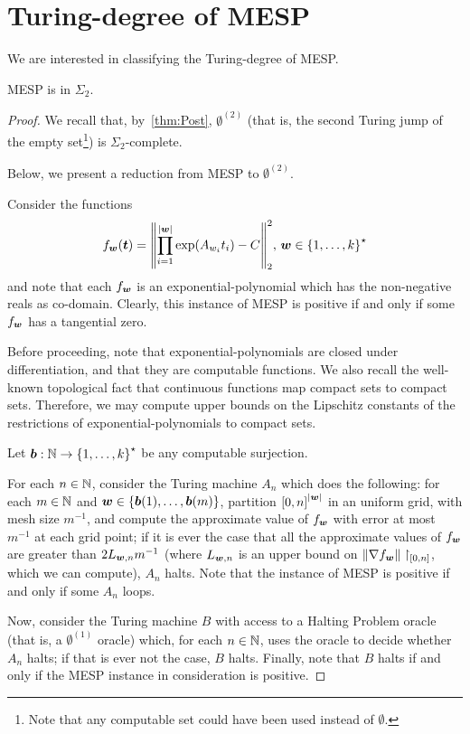 \section{Turing-degree of MESP}
\label{sec:turing-degree-lics}

We are interested in classifying the Turing-degree of MESP\@.

\begin{theorem}
\label{thm:turing-degree-2}
  MESP is in $\Sigma_{2}$.
\end{theorem}

\begin{proof}
We recall that, by~\cref{thm:Post}, $\emptyset^{(2)}$ (that is, the second Turing jump of the empty set\footnote{Note that any computable set could have been used instead of $\emptyset$.}) is $\Sigma_{2}$-complete.

Below, we present a reduction from MESP to $\emptyset^{(2)}$.

Consider the functions
\begin{equation*}
    f_{\boldsymbol{w}}(\boldsymbol{t}) = {\left \| \prod \limits_{i=1}^{\lvert \boldsymbol{w} \rvert} \exp(A_{w_{i}} t_{i}) - C \right \|}_{2}^{2}, \, \boldsymbol{w} \in {\lbrace 1, \ldots, k \rbrace}^{\star}
\end{equation*}
and note that each $f_{\boldsymbol{w}}$ is an exponential-polynomial which has the non-negative reals as co-domain. Clearly, this instance of MESP is positive if and only if some $f_{\boldsymbol{w}}$ has a tangential zero.

Before proceeding, note that exponential-polynomials are closed under differentiation, and that they are computable functions. We also recall the well-known topological fact that continuous functions map compact sets to compact sets. Therefore, we may compute upper bounds on the Lipschitz constants of the restrictions of exponential-polynomials to compact sets.

Let $\boldsymbol{b} : \mathbb{N} \rightarrow {\lbrace 1, \ldots, k \rbrace}^{\star}$ be any computable surjection.

For each $n \in \mathbb{N}$, consider the Turing machine $A_{n}$ which does the following:
for each $m \in \mathbb{N}$ and $\boldsymbol{w} \in \lbrace \boldsymbol{b}(1), \ldots, \boldsymbol{b}(m) \rbrace$, partition ${[0,n]}^{\lvert \boldsymbol{w} \rvert}$ in an uniform grid, with mesh size $m^{-1}$, and compute the approximate value of $f_{\boldsymbol{w}}$ with error at most $m^{-1}$ at each grid point;
if it is ever the case that all the approximate values of $f_{\boldsymbol{w}}$ are greater than $2 L_{\boldsymbol{w}, n} m^{-1}$ (where $L_{\boldsymbol{w}, n}$ is an upper bound on ${\| \nabla f_{\boldsymbol{w}} \|}\restriction_{[0,n]}$, which we can compute), $A_{n}$ halts. Note that the instance of MESP is positive if and only if some $A_{n}$ loops.

Now, consider the Turing machine $B$ with access to a Halting Problem oracle (that is, a $\emptyset^{(1)}$ oracle) which, for each $n \in \mathbb{N}$, uses the oracle to decide whether $A_{n}$ halts; if that is ever not the case, $B$ halts. Finally, note that $B$ halts if and only if the MESP instance in consideration is positive.
\end{proof}

